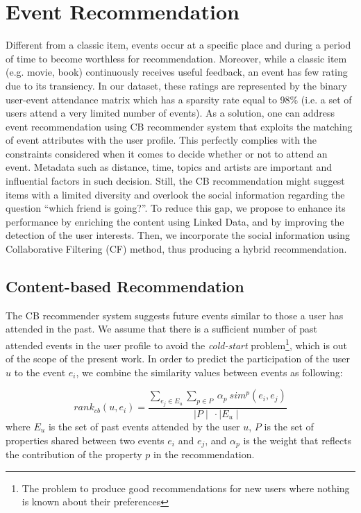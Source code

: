 \section{Event Recommendation }
\label{sec:event-recommendation}
Different from a classic item, events occur at a specific place and during a period of time to become worthless for recommendation. Moreover, while a classic item (e.g. movie, book) continuously receives useful feedback, an event has few rating due to its transiency. In our dataset, these ratings are represented by the binary user-event attendance matrix which has a sparsity rate equal to 98\% (i.e. a set of users attend a very limited number of events). As a solution, one can address event recommendation using CB recommender system that exploits the matching of event attributes with the user profile. This perfectly complies with the constraints considered when it comes to decide whether or not to attend an event. Metadata such as distance, time, topics and artists are important and influential factors in such decision. Still, the CB recommendation might suggest items with a limited diversity and overlook the social information regarding the question ``which friend is going?''. To reduce this gap, we propose to enhance its performance by enriching the content using Linked Data, and by improving the detection of the user interests. Then, we incorporate the social information using Collaborative Filtering (CF) method, thus producing a hybrid recommendation.


\subsection{Content-based Recommendation}
The CB recommender system suggests future events similar to those a user has attended in the past. We assume that there is a sufficient number of past attended events in the user profile to avoid the \textit{cold-start} problem\footnote{The problem to produce good recommendations for new users where nothing is known about their preferences}, which is out of the scope of the present work. In order to predict the participation of the user $u$ to the event $e_{i}$, we combine the similarity values between events as following: 

\begin{equation}\label{eq:rankcb}
rank_{cb}(u,e_{i})= \frac{\sum_{e_{j} \in E_{u}} \sum_{p\in P} \ \alpha_{p}\ sim^p(e_{i},e_{j})}{\mid P \mid\  \cdot \mid E_{u}\mid}
\end{equation}
where $E_{u}$ is the set of past events attended by the user $u$, $P$ is the set of properties shared between two events $e_{i}$ and $e_{j}$, and $\alpha_{p}$ is the weight that reflects the contribution of the property $p$ in the recommendation.

